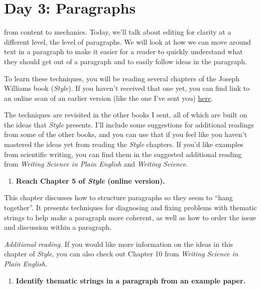 \documentclass[]{tufte-book}
\providecommand{\tightlist}{%
  \setlength{\itemsep}{0pt}\setlength{\parskip}{0pt}}
\begin{document}
\hypertarget{day-3-paragraphs}{%
\chapter{Day 3: Paragraphs}\label{day-3-paragraphs}}

 from content to mechanics. Today,
we'll talk about editing for clarity at a different level, the level of
paragraphs. We will look at how we can move around text in a paragraph to make
it easier for a reader to quickly understand what they should get out of a
paragraph and to easily follow ideas in the paragraph.

To learn these techniques, you will be reading several chapters of the Joseph
Williams book (\emph{Style}). If you haven't received that one yet, you can find link
to an online scan of an earlier version (like the one I've sent you)
\href{https://sites.duke.edu/niou/files/2014/07/WilliamsJosephM1990StyleTowardClarityandGrace.pdf}{here}.

The techniques are revisited in the other books I sent, all of which are built
on the ideas that \emph{Style} presents. I'll include some suggestions for additional
readings from some of the other books, and you can use that if you feel like you
haven't mastered the ideas yet from reading the \emph{Style} chapters. If you'd like
examples from scientific writing, you can find them in the suggested additional
reading from \emph{Writing Science in Plain English} and \emph{Writing Science}.

\begin{enumerate}
\def\labelenumi{\arabic{enumi}.}
\tightlist
\item
  \textbf{Reach Chapter 5 of \emph{Style} (online version).}
\end{enumerate}

This chapter discusses how to structure paragraphs so they seem to ``hang
together''. It presents techniques for diagnosing and fixing problems with
thematic strings to help make a paragraph more coherent, as well as how to order
the issue and discussion within a paragraph.

\emph{Additional reading.} If you would like more information on the ideas in this
chapter of \emph{Style}, you can also check out Chapter 10 from \emph{Writing Science in
Plain English}.

\begin{enumerate}
\def\labelenumi{\arabic{enumi}.}
\setcounter{enumi}{1}
\tightlist
\item
  \textbf{Identify thematic strings in a paragraph from an example paper.}
\end{enumerate}
\end{document}
